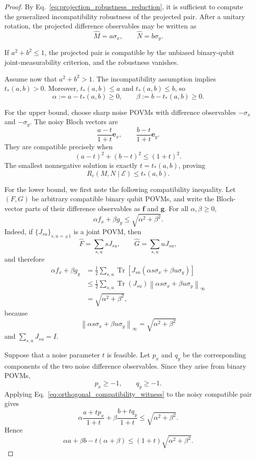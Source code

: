 \documentclass[
aps,pra,twocolumn,10pt,
superscriptaddress,longbibliography,floatfix
]{revtex4-2}
\DeclareMathOperator{\Tr}{Tr}
\begin{document}
\begin{proof}
By Eq.~\eqref{eq:projection_robustness_reduction}, it is sufficient to compute the generalized incompatibility robustness of the projected pair. After a unitary rotation, the projected difference observables may be written as
\[
\widehat M=a\sigma_x,
\qquad
\widehat N=b\sigma_y.
\]

If $a^2+b^2\le1$, the projected pair is compatible by the unbiased binary-qubit joint-measurability criterion, and the robustness vanishes.

Assume now that $a^2+b^2>1$. The incompatibility assumption implies $t_*(a,b)>0$. Moreover, $t_*(a,b)\le a$ and $t_*(a,b)\le b$, so
\[
\alpha:=a-t_*(a,b)\ge0,
\qquad
\beta:=b-t_*(a,b)\ge0.
\]

For the upper bound, choose sharp noise POVMs with difference observables $-\sigma_x$ and $-\sigma_y$. The noisy Bloch vectors are
\[
\frac{a-t}{1+t}\mathbf e_x,
\qquad
\frac{b-t}{1+t}\mathbf e_y.
\]
They are compatible precisely when
\[
(a-t)^2+(b-t)^2\le(1+t)^2.
\]
The smallest nonnegative solution is exactly $t=t_*(a,b)$, proving
\[
R_c(M,N\mid\mathcal E)\le t_*(a,b).
\]

For the lower bound, we first note the following compatibility inequality. Let $(F,G)$ be arbitrary compatible binary qubit POVMs, and write the Bloch-vector parts of their difference observables as $\mathbf f$ and $\mathbf g$. For all $\alpha,\beta\ge0$,
\begin{equation}
\alpha f_x+\beta g_y
\le
\sqrt{\alpha^2+\beta^2}.
\label{eq:orthogonal_compatibility_witness}
\end{equation}
Indeed, if $\{J_{su}\}_{s,u=\pm1}$ is a joint POVM, then
\[
\widehat F=\sum_{s,u}sJ_{su},
\qquad
\widehat G=\sum_{s,u}uJ_{su},
\]
and therefore
\begin{align*}
\alpha f_x+\beta g_y
&=
\frac12
\sum_{s,u}
\Tr\!\left[
J_{su}
(\alpha s\sigma_x+\beta u\sigma_y)
\right]
\\
&\le
\frac12
\sum_{s,u}
\Tr(J_{su})
\left\|
\alpha s\sigma_x+\beta u\sigma_y
\right\|_\infty
\\
&=
\sqrt{\alpha^2+\beta^2},
\end{align*}
because
\[
\left\|
\alpha s\sigma_x+\beta u\sigma_y
\right\|_\infty
=
\sqrt{\alpha^2+\beta^2}
\]
and $\sum_{s,u}J_{su}=I$.

Suppose that a noise parameter $t$ is feasible. Let $p_x$ and $q_y$ be the corresponding components of the two noise difference observables. Since they arise from binary POVMs,
\[
p_x\ge-1,
\qquad
q_y\ge-1.
\]
Applying Eq.~\eqref{eq:orthogonal_compatibility_witness} to the noisy compatible pair gives
\[
\alpha
\frac{a+tp_x}{1+t}
+
\beta
\frac{b+tq_y}{1+t}
\le
\sqrt{\alpha^2+\beta^2}.
\]
Hence
\begin{equation}
\alpha a+\beta b-t(\alpha+\beta)
\le
(1+t)\sqrt{\alpha^2+\beta^2}.
\label{eq:orthogonal_lower_intermediate}
\end{equation}


\end{proof}
\end{document}
